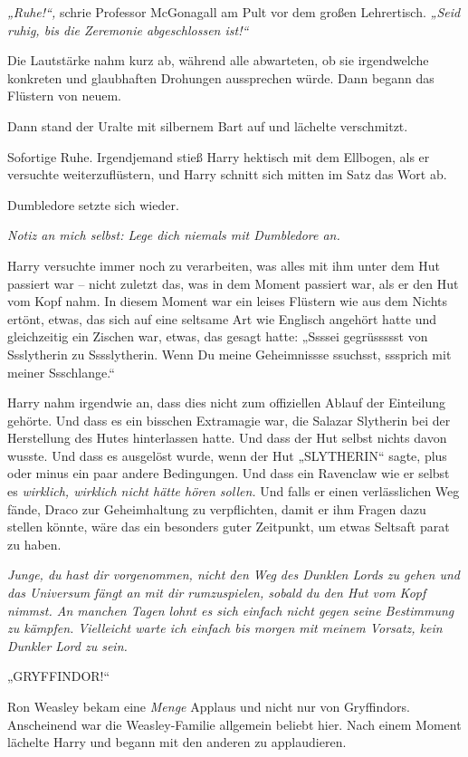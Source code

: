 {\emph{„Ruhe!“,} schrie Professor McGonagall am Pult vor dem großen Lehrertisch. \emph{„Seid ruhig, bis die Zeremonie abgeschlossen ist!“}

Die Lautstärke nahm kurz ab, während alle abwarteten, ob sie irgendwelche konkreten und glaubhaften Drohungen aussprechen würde. Dann begann das Flüstern von neuem.

Dann stand der Uralte mit silbernem Bart auf und lächelte verschmitzt.

Sofortige Ruhe. Irgendjemand stieß Harry hektisch mit dem Ellbogen, als er versuchte weiterzuflüstern, und Harry schnitt sich mitten im Satz das Wort ab.

Dumbledore setzte sich wieder.

\emph{Notiz an mich selbst: Lege dich niemals mit Dumbledore an.}

Harry versuchte immer noch zu verarbeiten, was alles mit ihm unter dem Hut passiert war -- nicht zuletzt das, was in dem Moment passiert war, als er den Hut vom Kopf nahm. In diesem Moment war ein leises Flüstern wie aus dem Nichts ertönt, etwas, das sich auf eine seltsame Art wie Englisch angehört hatte und gleichzeitig ein Zischen war, etwas, das gesagt hatte: „Ssssei gegrüssssst von Ssslytherin zu Sssslytherin. Wenn Du meine Geheimnissse ssuchsst, sssprich mit meiner Ssschlange.“

Harry nahm irgendwie an, dass dies nicht zum offiziellen Ablauf der Einteilung gehörte. Und dass es ein bisschen Extramagie war, die Salazar Slytherin bei der Herstellung des Hutes hinterlassen hatte. Und dass der Hut selbst nichts davon wusste. Und dass es ausgelöst wurde, wenn der Hut „SLYTHERIN“ sagte, plus oder minus ein paar andere Bedingungen. Und dass ein Ravenclaw wie er selbst es \emph{wirklich, wirklich nicht hätte hören sollen.} Und falls er einen verlässlichen Weg fände, Draco zur Geheimhaltung zu verpflichten, damit er ihm Fragen dazu stellen könnte, wäre das ein besonders guter Zeitpunkt, um etwas Seltsaft parat zu haben.

\emph{Junge, du hast dir vorgenommen, nicht den Weg des Dunklen Lords zu gehen und das Universum fängt an mit dir rumzuspielen, sobald du den Hut vom Kopf nimmst. An manchen Tagen lohnt es sich einfach nicht gegen seine Bestimmung zu kämpfen. Vielleicht warte ich einfach bis morgen mit meinem Vorsatz, kein Dunkler Lord zu sein.}

„GRYFFINDOR!“

Ron Weasley bekam eine \emph{Menge} Applaus und nicht nur von Gryffindors. Anscheinend war die Weasley-Familie allgemein beliebt hier. Nach einem Moment lächelte Harry und begann mit den anderen zu applaudieren.

}
